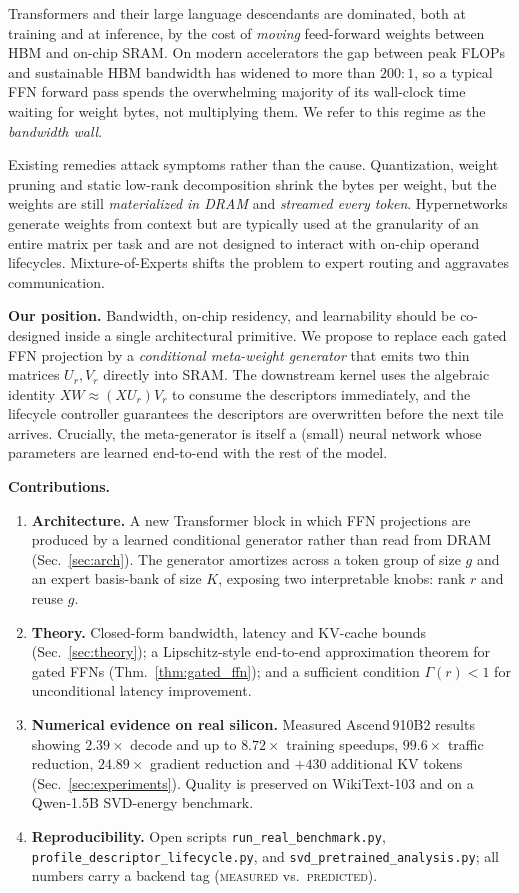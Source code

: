 \documentclass[11pt]{article}
\theoremstyle{definition}
\begin{document}
Transformers \cite{vaswani2017attention} and their large language descendants are dominated, both at training and at inference, by the cost of \emph{moving} feed-forward weights between HBM and on-chip SRAM. On modern accelerators the gap between peak FLOPs and sustainable HBM bandwidth has widened to more than $200{:}1$, so a typical FFN forward pass spends the overwhelming majority of its wall-clock time waiting for weight bytes, not multiplying them. We refer to this regime as the \emph{bandwidth wall}.

Existing remedies attack symptoms rather than the cause. Quantization, weight pruning and static low-rank decomposition shrink the bytes per weight, but the weights are still \emph{materialized in DRAM} and \emph{streamed every token}. Hypernetworks \cite{ha2017hypernetworks} generate weights from context but are typically used at the granularity of an entire matrix per task and are not designed to interact with on-chip operand lifecycles. Mixture-of-Experts shifts the problem to expert routing and aggravates communication.

\textbf{Our position.} Bandwidth, on-chip residency, and learnability should be co-designed inside a single architectural primitive. We propose to replace each gated FFN projection by a \emph{conditional meta-weight generator} that emits two thin matrices $U_r,V_r$ directly into SRAM. The downstream kernel uses the algebraic identity $XW \approx (XU_r)V_r$ to consume the descriptors immediately, and the lifecycle controller guarantees the descriptors are overwritten before the next tile arrives. Crucially, the meta-generator is itself a (small) neural network whose parameters are learned end-to-end with the rest of the model.

\textbf{Contributions.}
\begin{enumerate}[leftmargin=1.4em,itemsep=2pt,topsep=2pt]
\item \textbf{Architecture.} A new Transformer block in which FFN projections are produced by a learned conditional generator rather than read from DRAM (Sec.~\ref{sec:arch}). The generator amortizes across a token group of size $g$ and an expert basis-bank of size $K$, exposing two interpretable knobs: rank $r$ and reuse $g$.
\item \textbf{Theory.} Closed-form bandwidth, latency and KV-cache bounds (Sec.~\ref{sec:theory}); a Lipschitz-style end-to-end approximation theorem for gated FFNs (Thm.~\ref{thm:gated_ffn}); and a sufficient condition $\Gamma(r){<}1$ for unconditional latency improvement.
\item \textbf{Numerical evidence on real silicon.} Measured Ascend\,910B2 results showing $2.39\times$ decode and up to $8.72\times$ training speedups, $99.6\times$ traffic reduction, $24.89\times$ gradient reduction and $+430$ additional KV tokens (Sec.~\ref{sec:experiments}). Quality is preserved on WikiText-103 and on a Qwen-1.5B SVD-energy benchmark.
\item \textbf{Reproducibility.} Open scripts \texttt{run\_real\_benchmark.py}, \texttt{profile\_descriptor\_lifecycle.py}, and \texttt{svd\_pretrained\_analysis.py}; all numbers carry a backend tag (\textsc{measured} vs.\ \textsc{predicted}).
\end{enumerate}
\end{document}
